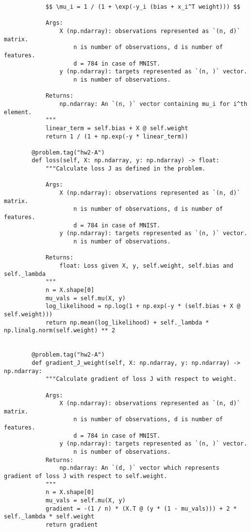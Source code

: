 \documentclass{article}
\begin{document}
\begin{lstlisting}
            $$ \mu_i = 1 / (1 + \exp(-y_i (bias + x_i^T weight))) $$
    
            Args:
                X (np.ndarray): observations represented as `(n, d)` matrix.
                    n is number of observations, d is number of features.
                    d = 784 in case of MNIST.
                y (np.ndarray): targets represented as `(n, )` vector.
                    n is number of observations.
    
            Returns:
                np.ndarray: An `(n, )` vector containing mu_i for i^th element.
            """
            linear_term = self.bias + X @ self.weight
            return 1 / (1 + np.exp(-y * linear_term))
        
        @problem.tag("hw2-A")
        def loss(self, X: np.ndarray, y: np.ndarray) -> float:
            """Calculate loss J as defined in the problem.
    
            Args:
                X (np.ndarray): observations represented as `(n, d)` matrix.
                    n is number of observations, d is number of features.
                    d = 784 in case of MNIST.
                y (np.ndarray): targets represented as `(n, )` vector.
                    n is number of observations.
    
            Returns:
                float: Loss given X, y, self.weight, self.bias and self._lambda
            """
            n = X.shape[0]
            mu_vals = self.mu(X, y)
            log_likelihood = np.log(1 + np.exp(-y * (self.bias + X @ self.weight)))
            return np.mean(log_likelihood) + self._lambda * np.linalg.norm(self.weight) ** 2
    
    
        @problem.tag("hw2-A")
        def gradient_J_weight(self, X: np.ndarray, y: np.ndarray) -> np.ndarray:
            """Calculate gradient of loss J with respect to weight.
    
            Args:
                X (np.ndarray): observations represented as `(n, d)` matrix.
                    n is number of observations, d is number of features.
                    d = 784 in case of MNIST.
                y (np.ndarray): targets represented as `(n, )` vector.
                    n is number of observations.
            Returns:
                np.ndarray: An `(d, )` vector which represents gradient of loss J with respect to self.weight.
            """
            n = X.shape[0]
            mu_vals = self.mu(X, y)
            gradient = -(1 / n) * (X.T @ (y * (1 - mu_vals))) + 2 * self._lambda * self.weight
            return gradient
    

\end{lstlisting}
\end{document}
